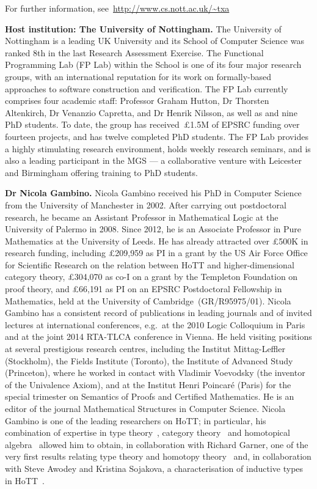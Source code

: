 \documentclass[a4paper,11pt]{article}
\begin{document}
For further information, see~\url{http://www.cs.nott.ac.uk/~txa}

\textbf{Host institution: The University of Nottingham.}  The
University of Nottingham is a leading UK University 
and its School of Computer Science was ranked 8th in the last Research
Assessment Exercise. The Functional Programming Lab (FP Lab) within the School
is one of its four major research groups, with an international
reputation for its work on formally-based approaches to software
construction and verification.  The FP Lab currently comprises four
academic staff: Professor Graham Hutton, Dr Thorsten Altenkirch, Dr
Venanzio Capretta, and Dr Henrik Nilsson, as well as and nine PhD students.
To date, the group has received~\pounds1.5M of EPSRC funding over fourteen
projects, and has twelve completed PhD students.
The FP Lab provides a highly stimulating research environment,
holds weekly research seminars, and is also a leading participant in the MGS
--- a collaborative venture with Leicester and Birmingham offering training
to PhD students.
\noindent

\textbf{Dr Nicola Gambino.} Nicola Gambino received his PhD in
Computer Science from the University of Manchester in 2002. After
carrying out postdoctoral research, he became an Assistant Professor
in Mathematical Logic at the University of Palermo in 2008. Since
 2012, he is an Associate Professor in Pure Mathematics at
the University of Leeds. He has already attracted over \pounds500K 
in research funding, including \pounds 209,959 as PI in a grant
by the US Air Force Office for Scientific
Research on the relation between HoTT and
higher-dimensional category theory,  \pounds 304,070 as co-I on a  grant 
by the Templeton Foundation on proof theory, and \pounds 66,191 as PI on
an EPSRC  Postdoctoral Fellowship in Mathematics, 
held at the University of Cambridge~(GR/R95975/01).
Nicola Gambino has a consistent record of
publications in leading journals and of invited lectures at
international conferences, {e.g.}~at the 2010 Logic Colloquium in Paris
and at the  joint 2014 RTA-TLCA conference in Vienna. He
held visiting positions at several prestigious research centres,
including the Institut Mittag-Leffler (Stockholm), the
Fields Institute (Toronto), the Institute of Advanced Study
(Princeton), where he worked in contact with Vladimir Voevodsky (the inventor of 
the Univalence Axiom), and at the Institut Henri Poincar\'e (Paris) for the special trimester on
Semantics of Proofs and Certified Mathematics.  He is an editor of the
journal Mathematical Structures in Computer Science. 
Nicola Gambino is one of the leading researchers on HoTT; in particular,
his combination of expertise in type theory~\cite{GambinoN:gentti}, category 
theory~\cite{gambinoHyland:welfoundedTrees,GambinoN:polfpm} and
homotopical algebra~\cite{GambinoN:homl2c,GambinoN:weilsh} allowed
him to obtain, in collaboration with Richard Garner, 
one of the very first results relating type theory and homotopy theory~\cite{GambinoN:idetwfs}
and, in collaboration with Steve Awodey and Kristina Sojakova, a characterisation of 
inductive types  in HoTT~\cite{awodeyGamSoja:indTypesInHTT}.
\end{document}
